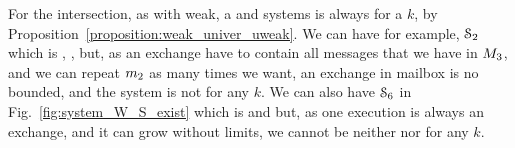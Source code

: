 %

For the intersection, as with weak, a \sS{} and \eb{} systems is always  for a $k$, by Proposition~\ref{proposition:weak_univer_uweak}. We can have for example, $\mathcal{S}_{2}$ which is \sS{}, \ub{}, 
 but, as an exchange have to contain all messages that we have in $M_3$, and we can repeat $m_2$ as many times we want, an exchange in mailbox is no bounded, and the system is not  for any $k$.
 We can also have $\mathcal{S}_{6}$ in Fig.~\ref{fig:system_W_S_exist} which is \sS{} and \eb{} but, as one execution is always an exchange, and it can grow without limits, we cannot be neither  nor  for any $k$.




%


